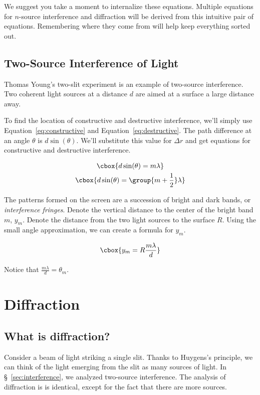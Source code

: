 \documentclass{hw}
\numberwithin{equation}{section}
\begin{document}
We suggest you take a moment to internalize these equations. Multiple equations
for $n$-source interference and diffraction will be derived from this intuitive
pair of equations. Remembering where they come from will help keep everything
sorted out.

\subsection{Two-Source Interference of Light}
Thomas Young's two-slit experiment is an example of two-source interference.
Two coherent light sources at a distance $d$ are aimed at a surface a large
distance away. 

To find the location of constructive and destructive interference, we'll simply
use Equation~\ref{eq:constructive} and Equation~\ref{eq:destructive}. The path
difference at an angle $\theta$ is $d \sin(\theta)$. We'll substitute this
value for $\Delta r$ and get equations for constructive and destructive
interference.

\begin{gather}
  \cbox{d \sin(\theta) = m \lambda} \label{eq:interference-constructive} \\
  \cbox{d \sin(\theta) = \group{m + \frac{1}{2}} \lambda}
\end{gather}

The patterns formed on the screen are a succession of bright and dark bands, or
\emph{interference fringes}. Denote the vertical distance to the center of the
bright band $m$, $y_m$. Denote the distance from the two light sources to the
surface $R$. Using the small angle approximation, we can create a formula for
$y_m$.

\begin{equation}
  \cbox{y_m = R \frac{m \lambda}{d}}
\end{equation}

Notice that $\frac{m \lambda}{d} = \theta_m$.

\section{Diffraction}
\subsection{What is diffraction?}
Consider a beam of light striking a single slit. Thanks to Huygens's principle,
we can think of the light emerging from the slit as many sources of light. In
\S~\ref{sec:interference}, we analyzed two-source interference. The analysis of
diffraction is is identical, except for the fact that there are more sources.
\end{document}
